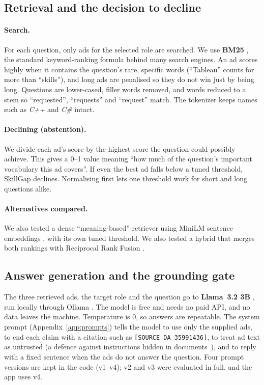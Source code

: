\subsection{Retrieval and the decision to decline}

\paragraph{Search.} For each question, only ads for the selected role are searched. We use \textbf{BM25} \citep{robertson2009bm25}, the standard keyword-ranking formula behind many search engines. An ad scores highly when it contains the question's rare, specific words (``Tableau'' counts for more than ``skills''), and long ads are penalised so they do not win just by being long. Questions are lower-cased, filler words removed, and words reduced to a stem so ``requested'', ``requests'' and ``request'' match. The tokenizer keeps names such as \emph{C++} and \emph{C\#} intact.

\paragraph{Declining (abstention).} We divide each ad's score by the highest score the question could possibly achieve. This gives a 0--1 value meaning ``how much of the question's important vocabulary this ad covers''. If even the best ad falls below a tuned threshold, SkillGap declines. Normalising first lets one threshold work for short and long questions alike.

\paragraph{Alternatives compared.} We also tested a dense ``meaning-based'' retriever using MiniLM sentence embeddings \citep{reimers2019sbert,wang2020minilm}, with its own tuned threshold. We also tested a hybrid that merges both rankings with Reciprocal Rank Fusion \citep{cormack2009rrf}.

\subsection{Answer generation and the grounding gate}

The three retrieved ads, the target role and the question go to \textbf{Llama~3.2 3B} \citep{grattafiori2024llama3}, run locally through Ollama \citep{ollama}. The model is free and needs no paid API, and no data leaves the machine. Temperature is 0, so answers are repeatable. The system prompt (Appendix~\ref{app:prompts}) tells the model to use only the supplied ads, to end each claim with a citation such as \texttt{[SOURCE DA\_35991436]}, to treat ad text as untrusted (a defence against instructions hidden in documents~\citep{greshake2023injection}), and to reply with a fixed sentence when the ads do not answer the question. Four prompt versions are kept in the code (v1--v4); v2 and v3 were evaluated in full, and the app uses v4.

